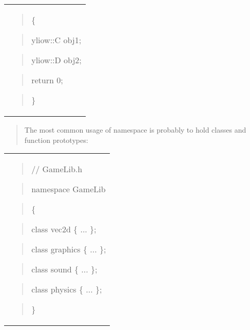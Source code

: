 \documentclass[
]{article}
\begin{document}
\begin{longtable}[]{@{}
  >{\raggedright\arraybackslash}p{}@{}}
\begin{quote}
\{
\end{quote}

\begin{quote}
yliow::C obj1;
\end{quote}

\begin{quote}
yliow::D obj2;
\end{quote}

\begin{quote}
return 0;
\end{quote}

\begin{quote}
\}
\end{quote} \\
\end{longtable}

\begin{quote}
The most common usage of namespace is probably to hold classes and
function prototypes:
\end{quote}

\begin{longtable}[]{@{}
  >{\raggedright\arraybackslash}p{}@{}}
\toprule\noalign{}
 \\
\midrule\noalign{}
\endhead
\bottomrule\noalign{}
\endlastfoot
\begin{quote}
// GameLib.h
\end{quote}

\begin{quote}
namespace GameLib
\end{quote}

\begin{quote}
\{
\end{quote}

\begin{quote}
class vec2d \{ ... \};
\end{quote}

\begin{quote}
class graphics \{ ... \};
\end{quote}

\begin{quote}
class sound \{ ... \};
\end{quote}

\begin{quote}
class physics \{ ... \};
\end{quote}

\begin{quote}
\}
\end{quote} \\
\end{longtable}
\end{document}
